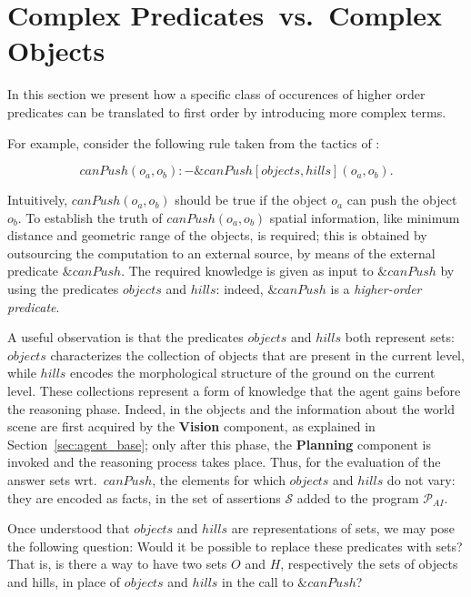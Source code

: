\section{Complex Predicates~vs.~Complex Objects}
\label{sec:main}

In this section we present how a specific class of occurences of higher order predicates can be translated to first order by introducing more complex terms.

For example, consider the following rule taken from the tactics of \ah:


$$ canPush(o_a,o_b) :- \&canPush[objects,hills](o_a,o_b). \label{main:rule-1} $$

Intuitively, $canPush(o_a, o_b)$ should be true if the object $o_a$ can push the object $o_b$.
To establish the truth of $canPush(o_a, o_b)$ spatial information, like minimum distance and geometric range of the objects, is required; this is obtained by outsourcing the computation to an external source, by means of the external predicate $\&canPush$.
The required knowledge is given as input to $\&canPush$ by using the predicates $objects$ and $hills$: indeed, $\&canPush$ is a \emph{higher-order predicate}.

A useful observation is that the predicates $objects$ and $hills$ both represent sets: $objects$ characterizes the collection of objects that are present in the current level, while $hills$ encodes the morphological structure of the ground on the current level.
These collections represent a form of knowledge that the agent gains before the reasoning phase.
Indeed, in \ah the objects and the information about the world scene are first acquired by the \textbf{Vision} component, as explained in Section~\ref{sec:agent_base}; only after this phase, the \textbf{Planning} component is invoked and the reasoning process takes place.
Thus, for the evaluation of the answer sets wrt.~$canPush$, the elements for which $objects$ and $hills$ do not vary: they are encoded as facts, in the set of assertions \(\mathcal{S}\) added to the program \(\mathcal{P}_{AI}\).

Once understood that $objects$ and $hills$ are representations of sets, we may pose the following question: Would it be possible to replace these predicates with sets?
That is, is there a way to have two sets $O$ and $H$, respectively the sets of objects and hills, in place of  $objects$ and $hills$ in the call to $\&canPush$?

